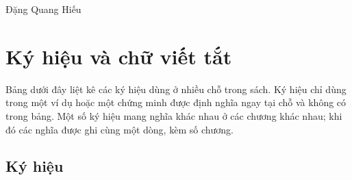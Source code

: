 \documentclass[
  10
]{article}
\begin{document}
Đặng Quang Hiếu

\section{Ký hiệu và chữ viết
tắt}\label{kuxfd-hiux1ec7u-vuxe0-chux1eef-viux1ebft-tux1eaft}

Bảng dưới đây liệt kê các ký hiệu dùng ở nhiều chỗ trong sách. Ký hiệu
chỉ dùng trong một ví dụ hoặc một chứng minh được định nghĩa ngay tại
chỗ và không có trong bảng. Một số ký hiệu mang nghĩa khác nhau ở các
chương khác nhau; khi đó các nghĩa được ghi cùng một dòng, kèm số
chương.

\subsection{Ký hiệu}\label{kuxfd-hiux1ec7u}
\end{document}
